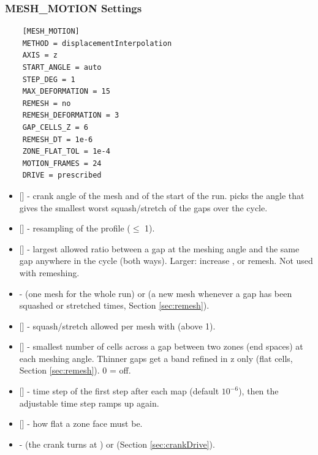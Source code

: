\subsubsection{MESH\_MOTION Settings}
\begin{lstlisting}
    [MESH_MOTION]
    METHOD = displacementInterpolation
    AXIS = z
    START_ANGLE = auto
    STEP_DEG = 1
    MAX_DEFORMATION = 15
    REMESH = no
    REMESH_DEFORMATION = 3
    GAP_CELLS_Z = 6
    REMESH_DT = 1e-6
    ZONE_FLAT_TOL = 1e-4
    MOTION_FRAMES = 24
    DRIVE = prescribed
\end{lstlisting}
\begin{itemize}
    \item {} [] - crank angle of the mesh and of the start of the run.  picks the angle that gives the smallest worst squash/stretch of the gaps over the cycle.
    \item {} [] - resampling of the profile ($\le$ 1).
    \item {} [] - largest allowed ratio between a gap at the meshing angle and the same gap anywhere in the cycle (both ways). Larger: increase , or remesh. Not used with remeshing.
    \item {} -  (one mesh for the whole run) or  (a new mesh whenever a gap has been squashed or stretched  times, Section \ref{sec:remesh}).
    \item {} [] - squash/stretch allowed per mesh with  (above 1).
    \item {} [] - smallest number of cells across a gap between two zones (end spaces) at each meshing angle. Thinner gaps get a band refined in z only (flat cells, Section \ref{sec:remesh}). 0 = off.
    \item {} [] - time step of the first step after each map (default $10^{-6}$), then the adjustable time step ramps up again.
    \item {} [] - how flat a zone face must be.
    \item {} -  (the crank turns at ) or  (Section \ref{sec:crankDrive}).
\end{itemize}

